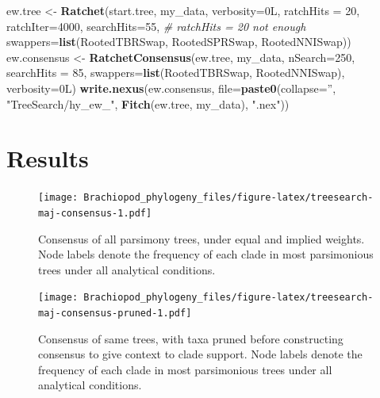 \documentclass[openany]{book}
\newenvironment{Shaded}{\begin{snugshade}}{\end{snugshade}}
\newcommand{\KeywordTok}[1]{\textcolor[rgb]{0.13,0.29,0.53}{\textbf{#1}}}
\newcommand{\DataTypeTok}[1]{\textcolor[rgb]{0.13,0.29,0.53}{#1}}
\newcommand{\DecValTok}[1]{\textcolor[rgb]{0.00,0.00,0.81}{#1}}
\newcommand{\StringTok}[1]{\textcolor[rgb]{0.31,0.60,0.02}{#1}}
\newcommand{\CommentTok}[1]{\textcolor[rgb]{0.56,0.35,0.01}{\textit{#1}}}
\newcommand{\NormalTok}[1]{#1}
\begin{document}
\begin{Shaded}
\begin{Highlighting}[]
\NormalTok{ew.tree <-}\StringTok{ }\KeywordTok{Ratchet}\NormalTok{(start.tree, my_data, }\DataTypeTok{verbosity=}\NormalTok{0L,}
                   \DataTypeTok{ratchHits =} \DecValTok{20}\NormalTok{, }\DataTypeTok{ratchIter=}\DecValTok{4000}\NormalTok{, }\DataTypeTok{searchHits=}\DecValTok{55}\NormalTok{, }\CommentTok{# ratchHits = 20 not enough}
                   \DataTypeTok{swappers=}\KeywordTok{list}\NormalTok{(RootedTBRSwap, RootedSPRSwap, RootedNNISwap))}
\NormalTok{ew.consensus <-}\StringTok{ }\KeywordTok{RatchetConsensus}\NormalTok{(ew.tree, my_data, }\DataTypeTok{nSearch=}\DecValTok{250}\NormalTok{, }\DataTypeTok{searchHits =} \DecValTok{85}\NormalTok{,}
                                 \DataTypeTok{swappers=}\KeywordTok{list}\NormalTok{(RootedTBRSwap, RootedNNISwap),}
                                 \DataTypeTok{verbosity=}\NormalTok{0L)}
\KeywordTok{write.nexus}\NormalTok{(ew.consensus, }\DataTypeTok{file=}\KeywordTok{paste0}\NormalTok{(}\DataTypeTok{collapse=}\StringTok{''}\NormalTok{, }\StringTok{"TreeSearch/hy_ew_"}\NormalTok{,}
                                      \KeywordTok{Fitch}\NormalTok{(ew.tree, my_data), }\StringTok{".nex"}\NormalTok{))}
\end{Highlighting}
\end{Shaded}

\section{Results}\label{results-1}







\begin{figure}
\centering
\texttt{[image: Brachiopod\_phylogeny\_files/figure-latex/treesearch-maj-consensus-1.pdf]}
\caption{\label{fig:treesearch-maj-consensus}Consensus of all parsimony trees, under equal and
implied weights.
Node labels denote the frequency of each clade in
most parsimonious trees under all analytical conditions.}
\end{figure}




\begin{figure}
\centering
\texttt{[image: Brachiopod\_phylogeny\_files/figure-latex/treesearch-maj-consensus-pruned-1.pdf]}
\caption{\label{fig:treesearch-maj-consensus-pruned}Consensus of same trees, with taxa pruned before
constructing consensus to give context to clade support.
Node labels denote the frequency of each clade in
most parsimonious trees under all analytical conditions.}
\end{figure}
\end{document}
